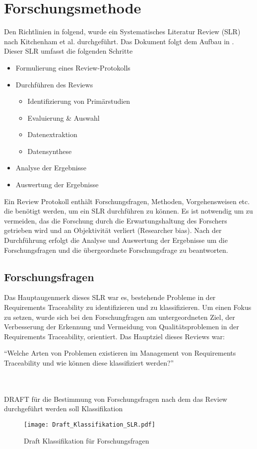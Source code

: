 \section{Forschungsmethode}
Den Richtlinien in \cite{Keele2007GuidelinesEngineering} folgend, wurde ein Systematisches Literatur Review (SLR) nach Kitchenham et al. durchgeführt. Das Dokument folgt dem Aufbau in \cite{Walia2009AErrors}. Dieser SLR umfasst die folgenden Schritte

\begin{itemize}
    \item Formulierung eines Review-Protokolls
    \item Durchführen des Reviews
        \begin{itemize}
            \item Identifizierung von Primärstudien
            \item Evaluierung \& Auswahl
            \item Datenextraktion
            \item Datensynthese
        \end{itemize}
    \item Analyse der Ergebnisse
    \item Auswertung der Ergebnisse
\end{itemize}

Ein Review Protokoll enthält Forschungsfragen, Methoden, Vorgehensweisen etc. die benötigt werden, um ein SLR durchführen zu können. Es ist notwendig um zu vermeiden, das die Forschung durch die Erwartungshaltung des Forschers getrieben wird und an Objektivität verliert (Researcher bias). Nach der Durchführung erfolgt die Analyse und Auswertung der Ergebnisse um die Forschungsfragen und die übergeordnete Forschungsfrage zu beantworten.

\subsection{Forschungsfragen}

Das Hauptaugenmerk dieses SLR war es, bestehende Probleme in der Requirements Traceability zu identifizieren und zu klassifizieren. Um einen Fokus zu setzen, wurde sich bei den Forschungfragen am untergeordneten Ziel, der Verbesserung der Erkennung und Vermeidung von Qualitätsproblemen in der Requirements Traceability, orientiert. Das Hauptziel dieses Reviews war:

\begin{center}
\enquote{Welche Arten von Problemen existieren im Management von Requirements Traceability und wie können diese klassifiziert werden?}
\end{center}


\\
\\
DRAFT für die Bestimmung von Forschungsfragen nach dem das Review durchgeführt werden soll
Klassifikation

\begin{figure}[!htb]
  \centering
  \texttt{[image: Draft\_Klassifikation\_SLR.pdf]}
  \caption{Draft Klassifikation für Forschungsfragen}
  \label{fig:abb3}
\end{figure}


